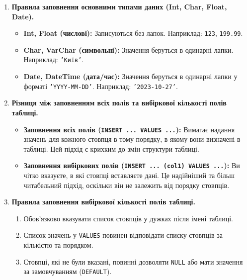 \documentclass{article}
\begin{document}
\begin{enumerate}[label=\arabic*., leftmargin=*]
        \item \textbf{Правила заповнення основними типами даних (Int, Char, Float, Date).}

        \begin{itemize}
            \item \textbf{Int, Float (числові):} Записуються без лапок. Наприклад: \texttt{123}, \texttt{199.99}.
            \item \textbf{Char, VarChar (символьні):} Значення беруться в одинарні лапки. Наприклад: \texttt{'Київ'}.
            \item \textbf{Date, DateTime (дата/час):} Значення беруться в одинарні лапки у форматі \texttt{'YYYY-MM-DD'}. Наприклад: \texttt{'2023-10-27'}.
        \end{itemize}
        
        \item \textbf{Різниця між заповненням всіх полів та вибіркової кількості полів таблиці.}

        \begin{itemize}
            \item \textbf{Заповнення всіх полів (\texttt{INSERT ... VALUES ...}):}
                Вимагає надання значень для кожного стовпця в тому
                порядку, в якому вони визначені в таблиці. Цей підхід є крихким
                до змін структури таблиці.

            \item \textbf{Заповнення вибіркових полів (\texttt{INSERT ... (col1) VALUES ...}):}
                Ви чітко вказуєте, в які стовпці
                вставляєте дані. Це надійніший та більш читабельний підхід,
                оскільки він не залежить від порядку стовпців.
        \end{itemize}
        
        \item \textbf{Правила заповнення вибіркової кількості полів таблиці.}

        \begin{enumerate}
            \item Обов'язково вказувати список стовпців у дужках після імені таблиці.
            \item Список значень у \texttt{VALUES} повинен відповідати списку стовпців за кількістю та порядком.
            \item Стовпці, які не були вказані, повинні дозволяти \texttt{NULL} або мати значення за замовчуванням (\texttt{DEFAULT}).
        \end{enumerate}
        

\end{enumerate}
\end{document}
